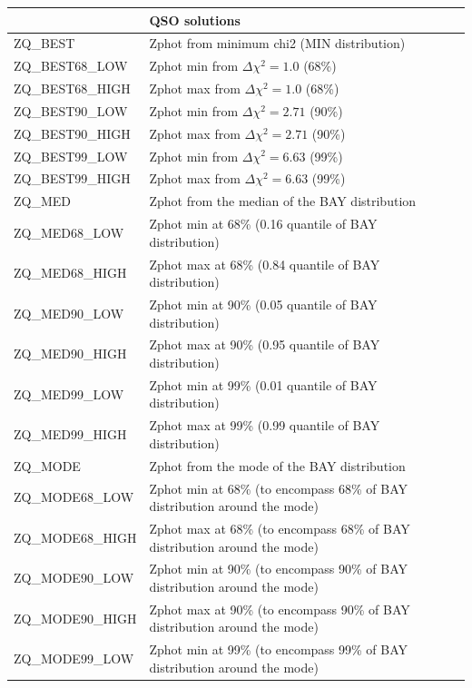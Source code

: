 \documentclass[12pt]{article}
\begin{document}
\begin{tabular}{llll}
\hline
\hline
 
\hline
    &   QSO solutions    \\
\hline
ZQ\_BEST            &    Zphot from minimum chi2 (MIN distribution)    \\
ZQ\_BEST68\_LOW     &    Zphot min  from   $\Delta \chi^2=1.0$   (68\%) \\
ZQ\_BEST68\_HIGH    &    Zphot max  from  $\Delta \chi^2=1.0$   (68\%)\\
ZQ\_BEST90\_LOW     &    Zphot min  from   $\Delta \chi^2=2.71$ (90\%)\\
ZQ\_BEST90\_HIGH    &    Zphot max  from  $\Delta \chi^2=2.71$ (90\%) \\  
ZQ\_BEST99\_LOW     &    Zphot min  from   $\Delta \chi^2=6.63$ (99\%)  \\
ZQ\_BEST99\_HIGH    &    Zphot max  from  $\Delta \chi^2=6.63$ (99\%)   \\ 
ZQ\_MED             &  Zphot from the median of the BAY distribution \\
ZQ\_MED68\_LOW     &   Zphot min at 68\% (0.16 quantile of BAY distribution)  \\ 
ZQ\_MED68\_HIGH    &   Zphot max at 68\% (0.84 quantile of BAY distribution)  \\ 
ZQ\_MED90\_LOW     &   Zphot min at 90\% (0.05 quantile of BAY distribution) \\ 
ZQ\_MED90\_HIGH    &   Zphot max at 90\% (0.95 quantile of BAY distribution)  \\ 
ZQ\_MED99\_LOW     &   Zphot min at 99\% (0.01 quantile of BAY distribution)  \\ 
ZQ\_MED99\_HIGH    &   Zphot max at 99\% (0.99 quantile of BAY distribution)  \\ 
ZQ\_MODE           &   Zphot from the mode of the BAY distribution \\
ZQ\_MODE68\_LOW    &   Zphot min at 68\% (to encompass 68\% of BAY distribution around the mode)  \\ 
ZQ\_MODE68\_HIGH   &   Zphot max at 68\% (to encompass 68\% of BAY distribution around the mode)  \\ 
ZQ\_MODE90\_LOW    &   Zphot min at 90\% (to encompass 90\% of BAY distribution around the mode) \\ 
ZQ\_MODE90\_HIGH   &   Zphot max at 90\% (to encompass 90\% of BAY distribution around the mode)  \\ 
ZQ\_MODE99\_LOW    &   Zphot min at 99\% (to encompass 99\% of BAY distribution around the mode)  \\ 

\end{tabular}
\end{document}
